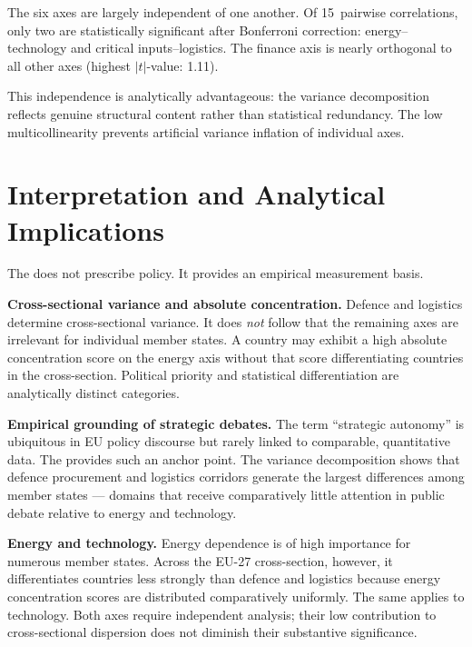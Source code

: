 The six axes are largely independent of one another.  Of
15~pairwise correlations, only two are statistically significant
after Bonferroni correction: energy--technology and critical
inputs--logistics.  The finance axis is nearly orthogonal to all
other axes (highest $|t|$-value: 1.11).

This independence is analytically advantageous: the variance
decomposition reflects genuine structural content rather than
statistical redundancy.  The low multicollinearity prevents
artificial variance inflation of individual axes.


\section{Interpretation and Analytical Implications}
\label{sec:implications}

The \ISI does not prescribe policy.  It provides an empirical
measurement basis.

\textbf{Cross-sectional variance and absolute concentration.}
Defence and logistics determine cross-sectional variance.  It does
\emph{not} follow that the remaining axes are irrelevant for
individual member states.  A country may exhibit a high absolute
concentration score on the energy axis without that score
differentiating countries in the cross-section.  Political priority
and statistical differentiation are analytically distinct
categories.

\textbf{Empirical grounding of strategic debates.}
The term ``strategic autonomy'' is ubiquitous in EU policy
discourse but rarely linked to comparable, quantitative data.  The
\ISI provides such an anchor point.  The variance decomposition
shows that defence procurement and logistics corridors generate the
largest differences among member states --- domains that receive
comparatively little attention in public debate relative to energy
and technology.

\begin{sloppypar}
\textbf{Energy and technology.}
Energy dependence is of high importance for numerous member states.
Across the EU-27 cross-section, however, it differentiates
countries less strongly than defence and logistics because energy
concentration scores are distributed comparatively uniformly.  The
same applies to technology.  Both axes require independent
analysis; their low contribution to cross-sectional dispersion does
not diminish their substantive significance.
\end{sloppypar}

